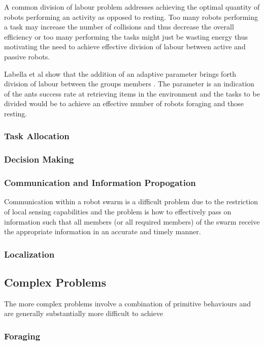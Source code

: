 A common division of labour problem addresses achieving the optimal quantity of robots performing an activity as opposed to resting. Too many robots performing a task may increase the number of collisions and thus decrease the overall efficiency or too many performing the tasks might just be wasting energy thus motivating the need to achieve effective division of labour between active and passive robots.

Labella et al show  that the addition of an adaptive parameter brings forth division of labour between the groups members \cite{labella2006division}. The parameter is an indication of the ants success rate at retrieving items in the environment and the tasks to be divided would be to achieve an effective number of robots foraging and those resting.


\subsubsection{Task Allocation}

\subsubsection{Decision Making}

\subsubsection{Communication and Information Propogation}
Communication within a robot swarm is a difficult problem due to the restriction of local sensing capabilities and the problem is how to effectively pass on information such that all members (or all required members) of the swarm receive the appropriate information in an accurate and timely manner.

\subsubsection{Localization}

\subsection{Complex Problems}
The more complex problems involve a combination of primitive behaviours and are generally substantially more difficult to achieve


\subsubsection{Foraging}
